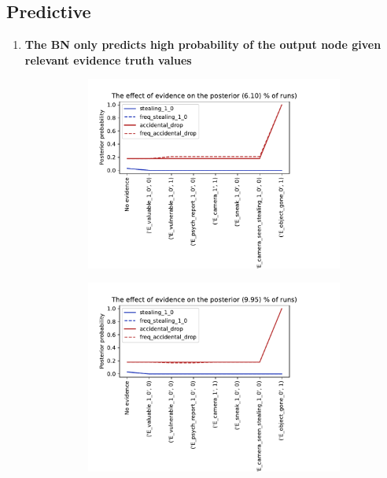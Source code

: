 \subsection{Predictive}
\begin{enumerate}
\item \textbf{The BN only predicts high probability of the output node given relevant evidence truth values}

\begin{figure}[htbp]
\begin{center}
\begin{subfigure}{.66\textwidth}
\includegraphics[width=\linewidth]{../experiments/GroteMarkt/plots/evidence_progress_GroteMarkt_1.pdf}
\caption{}
\label{default}
\end{subfigure}%
\begin{subfigure}{.66\textwidth}
\includegraphics[width=\linewidth]{../experiments/GroteMarkt/plots/evidence_progress_GroteMarkt_2.pdf}

\end{subfigure}
\end{center}
\end{figure}
\end{enumerate}
